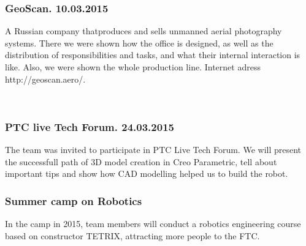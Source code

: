    \subsubsection{GeoScan. 10.03.2015}
	A Russian company thatproduces and sells unmanned aerial photography systems. There we were shown how the office is designed, as well as the distribution of responsibilities and tasks, and what their internal interaction is like. Also, we were shown the whole production line. Internet adress http://geoscan.aero/.
    \begin{figure}[H]
    	\\	
    \end{figure}
	\subsubsection{PTC live Tech Forum. 24.03.2015}
	 The team was invited to participate in PTC Live Tech Forum. We will present the successfull path of 3D model creation in Creo Parametric, tell about important tips and show how CAD modelling helped us to build the robot.
	
	\subsubsection{Summer camp on Robotics}
	In the camp in 2015, team members will conduct a robotics engineering course based on constructor TETRIX, attracting more people to the FTC.
	
	\fillpage
		
		
		
		
		
		
		
		
		
